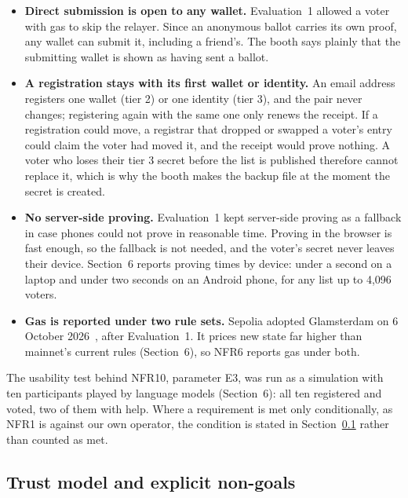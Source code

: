 \begin{itemize}[leftmargin=1.2em,itemsep=3pt,topsep=2pt]
  \item \textbf{Direct submission is open to any wallet.} Evaluation~1 allowed
        a voter with gas to skip the relayer. Since an anonymous ballot carries
        its own proof, any wallet can submit it, including a friend's. The
        booth says plainly that the submitting wallet is shown as having sent a
        ballot.

  \item \textbf{A registration stays with its first wallet or identity.} An
        email address registers one wallet (tier 2) or one identity (tier 3),
        and the pair never changes; registering again with the same one only
        renews the receipt. If a registration could move, a registrar that
        dropped or swapped a voter's entry could claim the voter had moved it,
        and the receipt would prove nothing. A voter who loses their tier 3
        secret before the list is published therefore cannot replace it, which
        is why the booth makes the backup file at the moment the secret is
        created.

  \item \textbf{No server-side proving.} Evaluation~1 kept server-side proving
        as a fallback in case phones could not prove in reasonable time.
        Proving in the browser is fast enough, so the fallback is not needed,
        and the voter's secret never leaves their device. Section~6 reports proving
        times by device: under a second on a laptop and under two seconds on an
        Android phone, for any list up to 4,096 voters.

  \item \textbf{Gas is reported under two rule sets.} Sepolia adopted
        Glamsterdam on 6 October 2026~\cite{glamsterdam}, after Evaluation~1.
        It prices new state far higher than mainnet's current rules
        (Section~6), so NFR6 reports gas under both.
\end{itemize}

The usability test behind NFR10, parameter E3, was run as a simulation with ten
participants played by language models (Section~6): all ten registered and
voted, two of them with help. Where a requirement is met only conditionally, as
NFR1 is against our own operator, the condition is stated in
Section~\ref{sec:trust} rather than counted as met.

\subsection{Trust model and explicit non-goals}\label{sec:trust}

